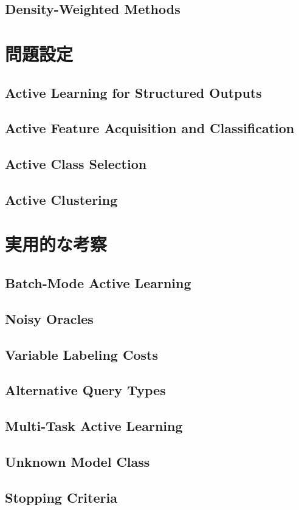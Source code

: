 \documentclass[11pt]{report}
\begin{document}
\subsection{Density-Weighted Methods}

\section{問題設定}
\subsection{Active Learning for Structured Outputs}
\subsection{Active Feature Acquisition and Classification}
\subsection{Active Class Selection}
\subsection{Active Clustering}

\section{実用的な考察}
\subsection{Batch-Mode Active Learning}
\subsection{Noisy Oracles}
\subsection{Variable Labeling Costs}
\subsection{Alternative Query Types}
\subsection{Multi-Task Active Learning}
\subsection{Unknown Model Class}
\subsection{Stopping Criteria}



\end{document}
